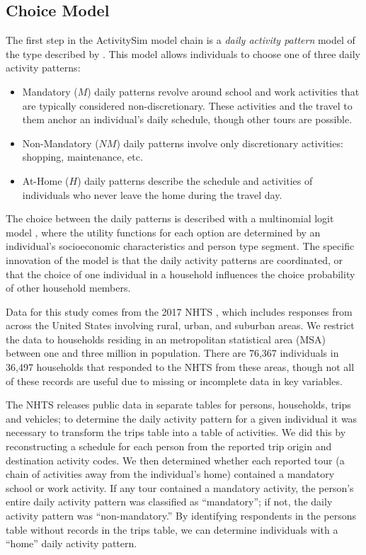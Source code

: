 \documentclass[3p, authoryear, review]{elsarticle} %
\providecommand{\tightlist}{%
  \setlength{\itemsep}{0pt}\setlength{\parskip}{0pt}}
\begin{document}
\hypertarget{choice-model}{%
\subsection{Choice Model}\label{choice-model}}

The first step in the ActivitySim model chain is a \emph{daily activity pattern}
model of the type described by \citet{Bradley2005}. This model
allows individuals to choose one of three daily activity patterns:

\begin{itemize}
\tightlist
\item
  Mandatory (\(M\)) daily patterns revolve around school and work activities that
  are typically considered non-discretionary. These activities and the travel
  to them anchor an individual's daily schedule, though other tours are possible.
\item
  Non-Mandatory (\(NM\)) daily patterns involve only discretionary activities:
  shopping, maintenance, etc.
\item
  At-Home (\(H\)) daily patterns describe the schedule and activities of
  individuals who never leave the home during the travel day.
\end{itemize}

The choice between the daily patterns is described with a multinomial logit
model \citep{Domencich1975}, where the utility functions for each option are
determined by an individual's socioeconomic characteristics and person type
segment. The specific innovation of the \citet{Bradley2005} model is that the daily
activity patterns are coordinated, or that the choice of one individual in a
household influences the choice probability of other household members.

Data for this study comes from the 2017 NHTS \citep{fhwa2017}, which includes
responses from across the United States involving rural, urban, and suburban
areas. We restrict the data to households residing in an metropolitan statistical
area (MSA) between one and three million in population. There are
76,367 individuals in 36,497 households that responded to the NHTS from these
areas, though not all of these records are useful due to missing or incomplete
data in key variables.

The NHTS releases public data in separate tables for persons, households,
trips and vehicles; to determine the daily activity pattern for a given
individual it was necessary to transform the trips table into a table of
activities. We did this by reconstructing a schedule for each person from the
reported trip origin and destination activity codes. We then determined whether
each reported tour (a chain of activities away from the individual's home)
contained a mandatory school or work activity. If any tour contained a mandatory
activity, the person's entire daily activity pattern was classified as ``mandatory'';
if not, the daily activity pattern was ``non-mandatory.'' By identifying respondents
in the persons table without records in the trips table, we can determine
individuals with a ``home'' daily activity pattern.
\end{document}
